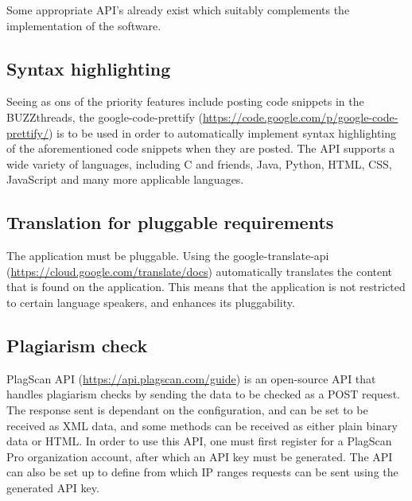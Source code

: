 

\begin{flushleft}
	Some appropriate API's already exist which suitably complements the implementation of the software.
	
	\subsection{Syntax highlighting}
	Seeing as ons of the priority features include posting code snippets in the BUZZthreads, the google-code-prettify (\url{https://code.google.com/p/google-code-prettify/}) is to be used in order to automatically implement syntax highlighting of the aforementioned code snippets when they are posted. The API supports a wide variety of languages, including C and friends, Java, Python, HTML, CSS, JavaScript and many more applicable languages.
	\subsection{Translation for pluggable requirements}
	The application must be pluggable. Using the google-translate-api (\url{https://cloud.google.com/translate/docs}) 
	automatically translates the content that is found on the application. This means that the application is not restricted to certain language speakers, and enhances its pluggability.
	\subsection{Plagiarism check}
	PlagScan API (\url{https://api.plagscan.com/guide}) is an open-source API that handles plagiarism checks by sending the data to be checked as a POST request. The response sent is dependant on the configuration, and can be set to be received as XML data, and some methods can be received as either plain binary data or HTML. In order to use this API, one must first register for a PlagScan Pro organization account, after which an API key must be generated. The API can also be set up to define from which IP ranges requests can be sent using the generated API key.


\end{flushleft}